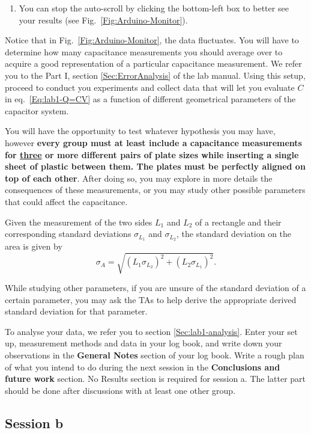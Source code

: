 \documentclass[12pt]{report}
\begin{document}
\begin{enumerate}
\item You can stop the auto-scroll by clicking the bottom-left box to better see your results (see Fig.~\ref{Fig:Arduino-Monitor}).
\end{enumerate}

Notice that in Fig.~\ref{Fig:Arduino-Monitor}, the data fluctuates. You will have to determine how many capacitance measurements  you should average over to acquire a good representation of a particular capacitance measurement. 
We refer you to the Part I, section \ref{Sec:ErrorAnalysis} of the lab manual. Using this setup, proceed to conduct you experiments and collect data that will let you evaluate $C$ in eq.~\eqref{Eq:lab1-Q=CV} as a function of different geometrical parameters of the capacitor system. 

You will have the opportunity to test whatever hypothesis you may have, however  \textbf{every group must at least include a capacitance measurements for \underline{three} or more different pairs of plate sizes while inserting a single sheet of plastic between them. 
The plates must be perfectly aligned on top of each other}. After doing so, you may explore in more details the consequences of these measurements, or you may study other possible parameters that could affect the capacitance.

Given the measurement of the two sides $L_1$ and $L_2$ of a rectangle and their corresponding standard deviations $\sigma_{L_1}$ and $\sigma_{L_2}$, the standard deviation on the area is given by
\begin{equation}
\sigma_A = \sqrt{ \left( L_1 \sigma_{L_2} \right)^2 + \left( L_2 \sigma_{L_1} \right)^2 }.
\end{equation}

While studying other parameters, if you are unsure of the standard deviation of a certain parameter, you may ask the TAs to help derive the appropriate derived standard deviation for that parameter.

To analyse your data, we refer you to section \ref{Sec:lab1-analysis}.
{\color{blue}Enter your set up, measurement methods and data in your log book, and write down your observations in the \textbf{General Notes} section of your log book. Write  a rough plan of what you intend to do during the next session in the \textbf{Conclusions and future work} section. No Results section is required for session a}. The latter part should be done after discussions with at least one other group.

\subsection{Session b}
\end{document}
